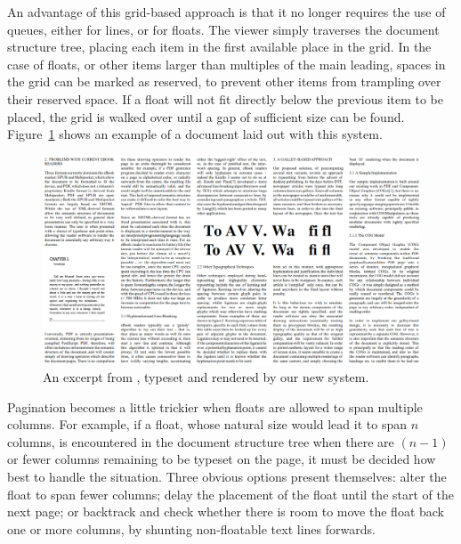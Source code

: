 An advantage of this grid-based approach is that it no longer requires the use of queues, either for lines, or for floats. The viewer simply traverses the document structure tree, placing each item in the first available place in the grid. In the case of floats, or other items larger than multiples of the main leading, spaces in the grid can be marked as reserved, to prevent other items from trampling over their reserved space. If a float will not fit directly below the previous item to be placed, the grid is walked over until a gap of sufficient size can be found. Figure~\ref{fig:screengrab} shows an example of a document laid out with this system.



\begin{figure}
    \includegraphics[angle=90,origin=c,width=\textwidth]{gfx/floatrendering}
    \caption[A sample rendering with multi-column floats]{An excerpt from \cite{Pinkney2011}, typeset and rendered by our new system.}
    \label{fig:screengrab}
\end{figure}

Pagination becomes a little trickier when floats are allowed to span multiple columns. For example, if a float, whose natural size would lead it to span $n$ columns, is encountered in the document structure tree when there are $(n-1)$ or fewer columns remaining to be typeset on the page, it must be decided how best to handle the situation. Three obvious options present themselves: alter the float to span fewer columns; delay the placement of the float until the start of the next page; or backtrack and check whether there is room to move the float back one or more columns, by shunting non-floatable text lines forwards.

